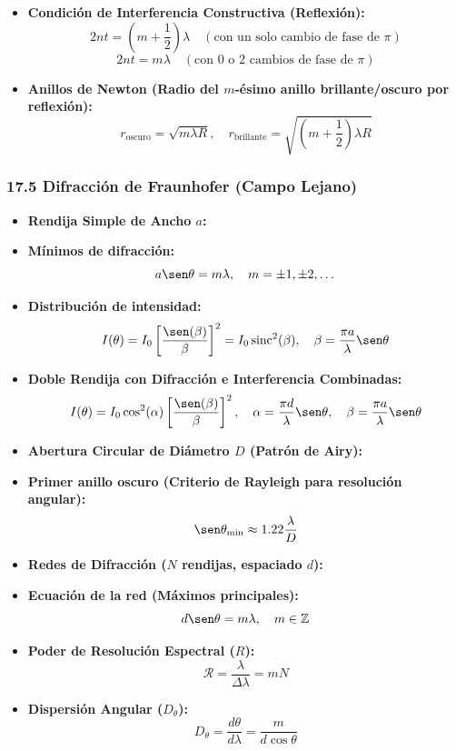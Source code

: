 \documentclass[11pt,a4paper]{article}
\begin{document}
\begin{itemize}
  \item \textbf{Condición de Interferencia Constructiva (Reflexión):}
  \[
    2 n t = \left( m + \frac{1}{2} \right)\lambda \quad (\text{con un solo cambio de fase de } \pi)
  \]
  \[
    2 n t = m \lambda \quad (\text{con } 0 \text{ o } 2 \text{ cambios de fase de } \pi)
  \]
  \item \textbf{Anillos de Newton (Radio del $m$-ésimo anillo brillante/oscuro por reflexión):}
  \[
    r_{\text{oscuro}} = \sqrt{m \lambda R}, \quad r_{\text{brillante}} = \sqrt{\left(m + \frac{1}{2}\right)\lambda R}
  \]
\end{itemize}

\subsubsection*{17.5 Difracción de Fraunhofer (Campo Lejano)}

\begin{itemize}
  \item \textbf{Rendija Simple de Ancho $a$:}
  \item \textbf{Mínimos de difracción:}
  \[
    a \sen\theta = m \lambda, \quad m = \pm 1, \pm 2, \dots
  \]
  \item \textbf{Distribución de intensidad:}
  \[
    I(\theta) = I_0 \left[ \frac{\sen(\beta)}{\beta} \right]^2 = I_0 \operatorname{sinc}^2(\beta), \quad \beta = \frac{\pi a}{\lambda}\sen\theta
  \]
  \item \textbf{Doble Rendija con Difracción e Interferencia Combinadas:}
  \[
    I(\theta) = I_0 \cos^2(\alpha) \left[ \frac{\sen(\beta)}{\beta} \right]^2, \quad \alpha = \frac{\pi d}{\lambda}\sen\theta, \quad \beta = \frac{\pi a}{\lambda}\sen\theta
  \]
  \item \textbf{Abertura Circular de Diámetro $D$ (Patrón de Airy):}
  \item \textbf{Primer anillo oscuro (Criterio de Rayleigh para resolución angular):}
  \[
    \sen\theta_{\min} \approx 1.22 \frac{\lambda}{D}
  \]
  \item \textbf{Redes de Difracción ($N$ rendijas, espaciado $d$):}
  \item \textbf{Ecuación de la red (Máximos principales):}
  \[
    d \sen\theta = m \lambda, \quad m \in \mathbb{Z}
  \]
  \item \textbf{Poder de Resolución Espectral ($R$):}
  \[
    \mathcal{R} = \frac{\lambda}{\Delta\lambda} = m N
  \]
  \item \textbf{Dispersión Angular ($D_\theta$):}
  \[
    D_\theta = \frac{d\theta}{d\lambda} = \frac{m}{d \cos\theta}
  \]
\end{itemize}
\end{document}
